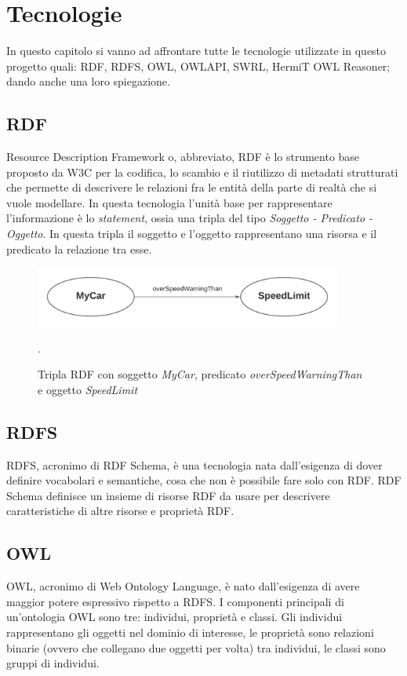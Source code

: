 \chapter{Tecnologie}
In questo capitolo si vanno ad affrontare tutte le tecnologie utilizzate in questo progetto quali: RDF, RDFS, OWL, OWLAPI, SWRL, HermiT OWL Reasoner; dando anche una loro spiegazione.
\section{RDF}
Resource Description Framework o, abbreviato, RDF \`e lo strumento base proposto da W3C per la codifica, lo scambio e il riutilizzo di metadati strutturati che permette di descrivere le relazioni fra le entit\`a della parte di realt\`a che si vuole modellare.
In questa tecnologia l'unit\`a base per rappresentare l'informazione \`e lo \textit{statement}, ossia una tripla del tipo \textit{Soggetto - Predicato - Oggetto}.
In questa tripla il soggetto e l'oggetto rappresentano una risorsa e il predicato la relazione tra esse. \cite{rdf}

\begin{figure}[h!]
    \centering
    \includegraphics[width=0.90\textwidth]{img/overSpeedWarningThanRDF.png}
   	\caption{Tripla RDF con soggetto \textit{MyCar}, predicato \textit{overSpeedWarningThan} e oggetto \textit{SpeedLimit}}.
	\label{fig:triplaRDF}
\end{figure}

\section{RDFS}
RDFS, acronimo di RDF Schema, \`e una tecnologia nata dall'esigenza di dover definire vocabolari e semantiche, cosa che non \`e possibile fare solo con RDF.
RDF Schema definisce un insieme di risorse RDF da usare per descrivere caratteristiche di altre risorse e propriet\`a RDF. \cite{rdfs}

\section{OWL}
OWL, acronimo di Web Ontology Language, \`e nato dall'esigenza di avere maggior potere espressivo rispetto a RDFS.
I componenti principali di un'ontologia OWL sono tre: individui, propriet\`a e classi. Gli individui rappresentano gli oggetti nel dominio di interesse, le propriet\`a sono relazioni binarie (ovvero che collegano due oggetti per volta) tra individui, le classi sono gruppi di individui.
\cite{owl}

